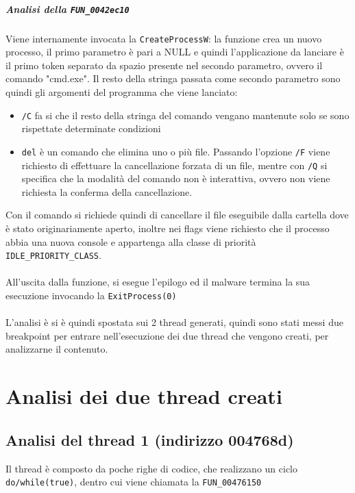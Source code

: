\documentclass[12pt]{extarticle}
\begin{document}
\subparagraph{Analisi della \texttt{FUN\_0042ec10}} Viene internamente invocata la \texttt{CreateProcessW}: la funzione crea un nuovo processo, il primo parametro è pari a NULL e quindi l'applicazione da lanciare è il primo token separato da spazio presente nel secondo parametro, ovvero il comando "cmd.exe". Il resto della stringa passata come secondo parametro sono quindi gli argomenti del programma che viene lanciato: 
\begin{itemize}
    \item \texttt{/C} fa si che il resto della stringa del comando vengano mantenute solo se sono rispettate determinate condizioni
    \item \texttt{del} è un comando che elimina uno o più file. Passando l'opzione \texttt{/F} viene richiesto di effettuare la cancellazione forzata di un file, mentre con \texttt{/Q} si specifica che la modalità del comando non è interattiva, ovvero non viene richiesta la conferma della cancellazione.
\end{itemize}
Con il comando si richiede quindi di cancellare il file eseguibile dalla cartella dove è stato originariamente aperto, inoltre nei flags viene richiesto che il processo abbia una nuova console e appartenga alla classe di priorità \texttt{IDLE\_PRIORITY\_CLASS}.\\\\All'uscita dalla funzione, si esegue l'epilogo ed il malware termina la sua esecuzione invocando la \texttt{ExitProcess(0)}
\\\\L'analisi è si è quindi spostata sui 2 thread generati, quindi sono stati messi due breakpoint per entrare nell'esecuzione dei due thread che vengono creati, per analizzarne il contenuto.


\section{Analisi dei due thread creati}
\subsection{Analisi del thread 1 (indirizzo 004768d)}
Il thread è composto da poche righe di codice, che realizzano un ciclo \texttt{do/while(true)}, dentro cui viene chiamata la \texttt{FUN\_00476150}
\end{document}
